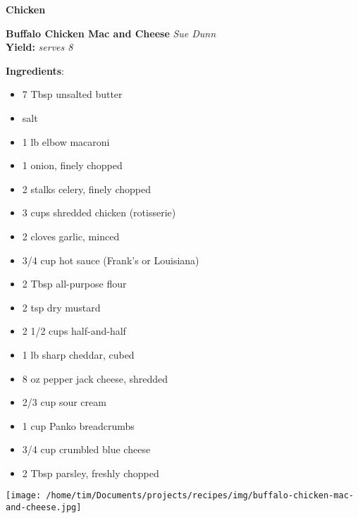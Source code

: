 \documentclass[11pt, twoside, openany]{book}
\begin{document}
{\newpage \LARGE \textbf{Chicken}} \label{chicken}\vspace{4mm}\\
\noindent\begin{minipage}[t]{\linewidth}%
{\Large\textbf{Buffalo Chicken Mac and Cheese}} \label{buffalo-chicken-mac-and-cheese}\hfill\textit{Sue Dunn}\\
\textbf{Yield:} \textit{serves 8}\\
\noindent\begin{minipage}[t]{0.78\linewidth}%
\textbf{Ingredients}:\vspace{-3mm}
\begin{multicols}{2}
\begin{itemize}\setlength\itemsep{-1mm}
\item 7 Tbsp unsalted butter
\item salt
\item 1 lb elbow macaroni
\item 1 onion, finely chopped
\item 2 stalks celery, finely chopped
\item 3 cups shredded chicken (rotisserie)
\item 2 cloves garlic, minced
\item 3/4 cup hot sauce (Frank's or Louisiana)
\item 2 Tbsp all-purpose flour
\item 2 tsp dry mustard
\item 2 1/2 cups half-and-half
\item 1 lb sharp cheddar, cubed
\item 8 oz pepper jack cheese, shredded
\item 2/3 cup sour cream
\item 1 cup Panko breadcrumbs
\item 3/4 cup crumbled blue cheese
\item 2 Tbsp parsley, freshly chopped
\end{itemize}
\end{multicols}
\end{minipage}
\noindent\begin{minipage}[t]{0.18\linewidth}
\centering \strut\vspace*{-\baselineskip}\newline
\texttt{[image: /home/tim/Documents/projects/recipes/img/buffalo-chicken-mac-and-cheese.jpg]}\\
\end{minipage}\vspace{3mm}

\end{minipage}
\end{document}
